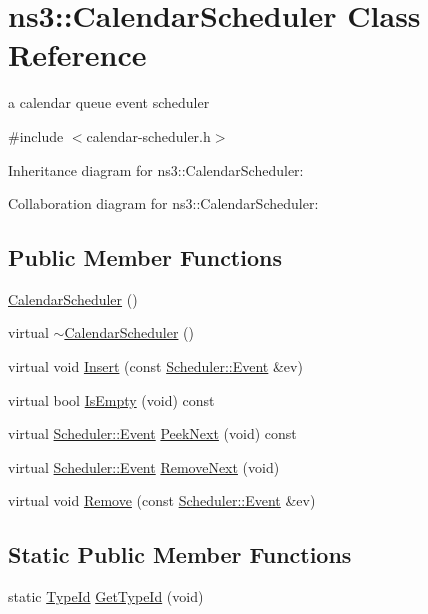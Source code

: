 \hypertarget{classns3_1_1CalendarScheduler}{}\section{ns3\+:\+:Calendar\+Scheduler Class Reference}
\label{classns3_1_1CalendarScheduler}


a calendar queue event scheduler  




{\ttfamily \#include $<$calendar-\/scheduler.\+h$>$}



Inheritance diagram for ns3\+:\+:Calendar\+Scheduler\+:


Collaboration diagram for ns3\+:\+:Calendar\+Scheduler\+:
\subsection*{Public Member Functions}
\begin{DoxyCompactItemize}
\item 
\hyperlink{classns3_1_1CalendarScheduler_a8fe003db517575b600aeaed7a02a8a18}{Calendar\+Scheduler} ()
\item 
virtual \hyperlink{classns3_1_1CalendarScheduler_ab50741c4abf454c217739370ca2e931d}{$\sim$\+Calendar\+Scheduler} ()
\item 
virtual void \hyperlink{classns3_1_1CalendarScheduler_aaf70c05e7468c8c232d4a309ce7c52c3}{Insert} (const \hyperlink{structns3_1_1Scheduler_1_1Event}{Scheduler\+::\+Event} \&ev)
\item 
virtual bool \hyperlink{classns3_1_1CalendarScheduler_a3b77785ce158cd5c3979acf5ed0ae7a0}{Is\+Empty} (void) const 
\item 
virtual \hyperlink{structns3_1_1Scheduler_1_1Event}{Scheduler\+::\+Event} \hyperlink{classns3_1_1CalendarScheduler_ab96cc3ce6187e5cf2f28fbcc944f6b0c}{Peek\+Next} (void) const 
\item 
virtual \hyperlink{structns3_1_1Scheduler_1_1Event}{Scheduler\+::\+Event} \hyperlink{classns3_1_1CalendarScheduler_ad86df04ee956851c73dfcc38d0fb3ac6}{Remove\+Next} (void)
\item 
virtual void \hyperlink{classns3_1_1CalendarScheduler_aee9db8a165f257bc94b51ffedc9b98d8}{Remove} (const \hyperlink{structns3_1_1Scheduler_1_1Event}{Scheduler\+::\+Event} \&ev)
\end{DoxyCompactItemize}
\subsection*{Static Public Member Functions}
\begin{DoxyCompactItemize}
\item 
static \hyperlink{classns3_1_1TypeId}{Type\+Id} \hyperlink{classns3_1_1CalendarScheduler_a862815eb693b8db0f2d53f7eb9eb4ca2}{Get\+Type\+Id} (void)
\end{DoxyCompactItemize}
